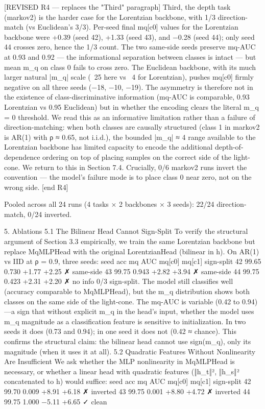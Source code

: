 [REVISED R4 — replaces the "Third" paragraph]
Third, the depth task (markov2) is the harder case for the Lorentzian backbone, with 1/3 direction-match (vs Euclidean's 3/3). Per-seed final mq[c0] values for the Lorentzian backbone were +0.39 (seed 42), +1.33 (seed 43), and −0.28 (seed 44); only seed 44 crosses zero, hence the 1/3 count. The two same-side seeds preserve mq-AUC at 0.93 and 0.92 — the informational separation between classes is intact — but mean m_q on class 0 fails to cross zero. The Euclidean backbone, with its much larger natural |m_q| scale (~25 here vs ~4 for Lorentzian), pushes mq[c0] firmly negative on all three seeds (−18, −10, −19). The asymmetry is therefore not in the existence of class-discriminative information (mq-AUC is comparable, 0.93 Lorentzian vs 0.95 Euclidean) but in whether the encoding clears the literal m_q = 0 threshold. We read this as an informative limitation rather than a failure of direction-matching: when both classes are causally structured (class 1 in markov2 is AR(1) with ρ ≈ 0.65, not i.i.d.), the bounded |m_q| ≈ 4 range available to the Lorentzian backbone has limited capacity to encode the additional depth-of-dependence ordering on top of placing samples on the correct side of the light-cone. We return to this in Section 7.4. Crucially, 0/6 markov2 runs invert the convention — the model's failure mode is to place class 0 near zero, not on the wrong side.
[end R4]

Pooled across all 24 runs (4 tasks × 2 backbones × 3 seeds): 22/24 direction-match, 0/24 inverted.

5. Ablations
5.1 The Bilinear Head Cannot Sign-Split
To verify the structural argument of Section 3.3 empirically, we train the same Lorentzian backbone but replace MqMLPHead with the original LorentzianHead (bilinear in h). On AR(1) vs IID at ρ = 0.9, three seeds:
seed
acc
mq AUC
mq[c0]
mq[c1]
sign-split
42
99.65%
0.730
+1.77
+2.25
✗ same-side
43
99.75%
0.943
+2.82
+3.94
✗ same-side
44
99.75%
0.423
+2.31
+2.20
✗ no info
0/3 sign-split. The model still classifies well (accuracy comparable to MqMLPHead), but the m_q distribution shows both classes on the same side of the light-cone. The mq-AUC is variable (0.42 to 0.94)—a sign that without explicit m_q in the head's input, whether the model uses m_q magnitude as a classification feature is sensitive to initialization. In two seeds it does (0.73 and 0.94); in one seed it does not (0.42 ≈ chance). This confirms the structural claim: the bilinear head cannot use sign(m_q), only its magnitude (when it uses it at all).
5.2 Quadratic Features Without Nonlinearity Are Insufficient
We ask whether the MLP nonlinearity in MqMLPHead is necessary, or whether a linear head with quadratic features (‖h_t‖², ‖h_s‖² concatenated to h) would suffice:
seed
acc
mq AUC
mq[c0]
mq[c1]
sign-split
42
99.70%
0.009
+8.91
+6.18
✗ inverted
43
99.75%
0.001
+8.80
+4.72
✗ inverted
44
99.75%
1.000
−5.11
+6.65
✓ clean

